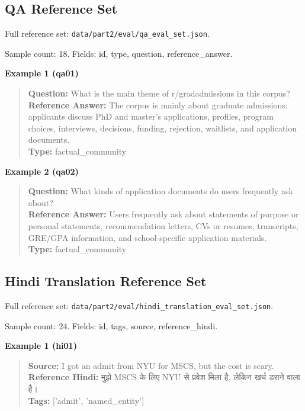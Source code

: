 \documentclass[11pt]{article}
\begin{document}
        \subsection*{QA Reference Set}

Full reference set: \texttt{data/part2/eval/qa\_eval\_set.json}.

Sample count: 18. Fields: id, type, question, reference\_answer.

\textbf{Example 1 (qa01)}
\begin{quote}\small
\textbf{Question:} What is the main theme of r/gradadmissions in this corpus?\\
\textbf{Reference Answer:} The corpus is mainly about graduate admissions: applicants discuss PhD and master's applications, profiles, program choices, interviews, decisions, funding, rejection, waitlists, and application documents.\\
\textbf{Type:} factual\_community\\
\end{quote}

\textbf{Example 2 (qa02)}
\begin{quote}\small
\textbf{Question:} What kinds of application documents do users frequently ask about?\\
\textbf{Reference Answer:} Users frequently ask about statements of purpose or personal statements, recommendation letters, CVs or resumes, transcripts, GRE/GPA information, and school-specific application materials.\\
\textbf{Type:} factual\_community\\
\end{quote}

        \subsection*{Hindi Translation Reference Set}

Full reference set: \texttt{data/part2/eval/hindi\_translation\_eval\_set.json}.

Sample count: 24. Fields: id, tags, source, reference\_hindi.

\textbf{Example 1 (hi01)}
\begin{quote}\small
\textbf{Source:} I got an admit from NYU for MSCS, but the cost is scary.\\
\textbf{Reference Hindi:} {\hindifont मुझे MSCS के लिए NYU से प्रवेश मिला है, लेकिन खर्च डराने वाला है।}\\
\textbf{Tags:} ['admit', 'named\_entity']\\
\end{quote}
\end{document}
